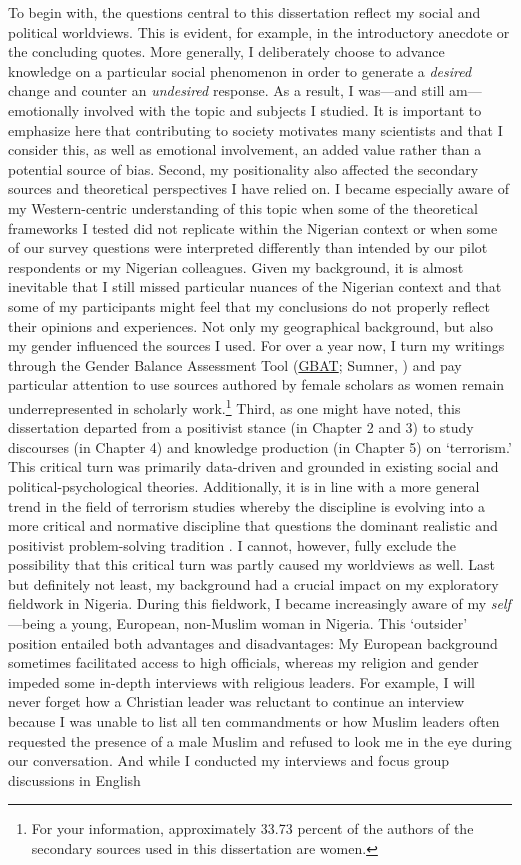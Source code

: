 To begin with, the questions central to this dissertation reflect my social and political worldviews. This is evident, for example, in the introductory anecdote or the concluding quotes. More generally, I deliberately choose to advance knowledge on a particular social phenomenon in order to generate a \textit{desired} change and counter an \textit{undesired} response. As a result, I was---and still am---emotionally involved with the topic and subjects I studied. It is important to emphasize here that contributing to society motivates many scientists and that I consider this, as well as emotional involvement, an added value rather than a potential source of bias. Second, my positionality also affected the secondary sources and theoretical perspectives I have relied on. I became especially aware of my Western-centric understanding of this topic when some of the theoretical frameworks I tested did not replicate within the Nigerian context or when some of our survey questions were interpreted differently than intended by our pilot respondents or my Nigerian colleagues. Given my background, it is almost inevitable that I still missed particular nuances of the Nigerian context and that some of my participants might feel that my conclusions do not properly reflect their opinions and experiences. Not only my geographical background, but also my gender influenced the sources I used. For over a year now, I turn my writings through the Gender Balance Assessment Tool (\href{https://jlsumner.shinyapps.io/syllabustool/}{GBAT}; Sumner, \citeyear{Sumner2018}) and pay particular attention to use sources authored by female scholars as women remain underrepresented in scholarly work.\footnote{For your information, approximately 33.73 percent of the authors of the secondary sources used in this dissertation are women.} Third, as one might have noted, this dissertation departed from a positivist stance (in Chapter 2 and 3) to study discourses (in Chapter 4) and knowledge production (in Chapter 5) on `terrorism.' This critical turn was primarily data-driven and grounded in existing social and political-psychological theories. Additionally, it is in line with a more general trend in the field of terrorism studies whereby the discipline is evolving into a more critical and normative discipline that questions the dominant realistic and positivist problem-solving tradition \citep{AlKassimi2019}. I cannot, however, fully exclude the possibility that this critical turn was partly caused my worldviews as well. Last but definitely not least, my background had a crucial impact on my exploratory fieldwork in Nigeria. During this fieldwork, I became increasingly aware of my \textit{self}---being a young, European, non-Muslim woman in Nigeria. This `outsider' position entailed both advantages and disadvantages: My European background sometimes facilitated access to high officials, whereas my religion and gender impeded some in-depth interviews with religious leaders. For example, I will never forget how a Christian leader was reluctant to continue an interview because I was unable to list all ten commandments or how Muslim leaders often requested the presence of a male Muslim and refused to look me in the eye during our conversation. And while I conducted my interviews and focus group discussions in English 